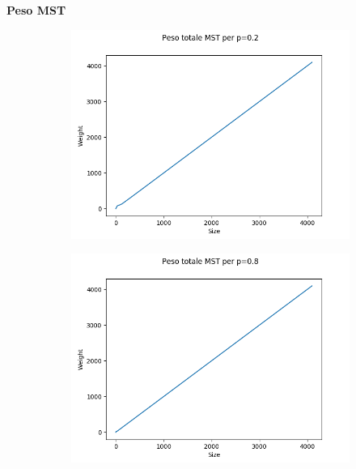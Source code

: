 \documentclass[]{article}
\begin{document}
\textbf{Peso MST}\\
\begin{figure}[H]
    \centering
    \begin{subfigure}[b]{0.45\linewidth} 
        \centering
        \includegraphics[width=\textwidth]{krusk_Weight_p=02}
        \label{fig:quick_casuale}
    \end{subfigure}
    \quad
    \begin{subfigure}[b]{0.45\linewidth}
        \centering
        \includegraphics[width=\textwidth]{krusk_Weight_p=08}
        \label{fig:quick_best}
    \end{subfigure}
\end{figure}
\end{document}
